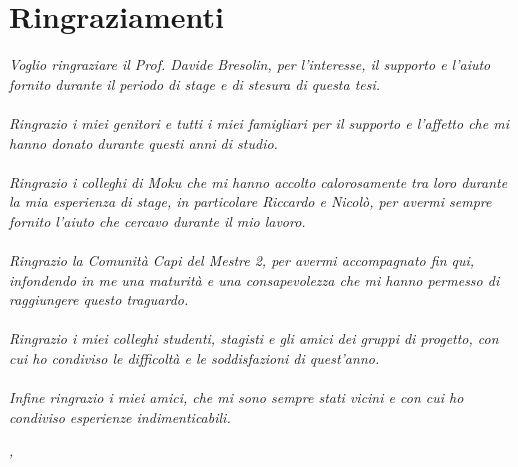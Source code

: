 \cleardoublepage
{}

\begingroup
\let\clearpage\relax
\let\cleardoublepage\relax
\let\cleardoublepage\relax

\chapter*{Ringraziamenti}
\textit{Voglio ringraziare il Prof. Davide Bresolin, per l'interesse, il supporto e l'aiuto fornito durante il periodo di stage e di stesura di questa tesi.} \\
\\
\textit{Ringrazio i miei genitori e tutti i miei famigliari per il supporto e l'affetto che mi hanno donato durante questi anni di studio.} \\
\\
\textit{Ringrazio i colleghi di Moku che mi hanno accolto calorosamente tra loro durante la mia esperienza di stage, in particolare Riccardo e Nicolò, per avermi sempre fornito l'aiuto che cercavo durante il mio lavoro.} \\
\\
\textit{Ringrazio la Comunità Capi del Mestre 2, per avermi accompagnato fin qui, infondendo in me una maturità e una consapevolezza che mi hanno permesso di raggiungere questo traguardo.} \\
\\
\textit{Ringrazio i miei colleghi studenti, stagisti e gli amici dei gruppi di progetto, con cui ho condiviso le difficoltà e le soddisfazioni di quest'anno.} \\
\\
\textit{Infine ringrazio i miei amici, che mi sono sempre stati vicini e con cui ho condiviso esperienze indimenticabili.} \\
\bigskip

\noindent\textit{\myLocation, \myTime}
\hfill \myName

\endgroup
